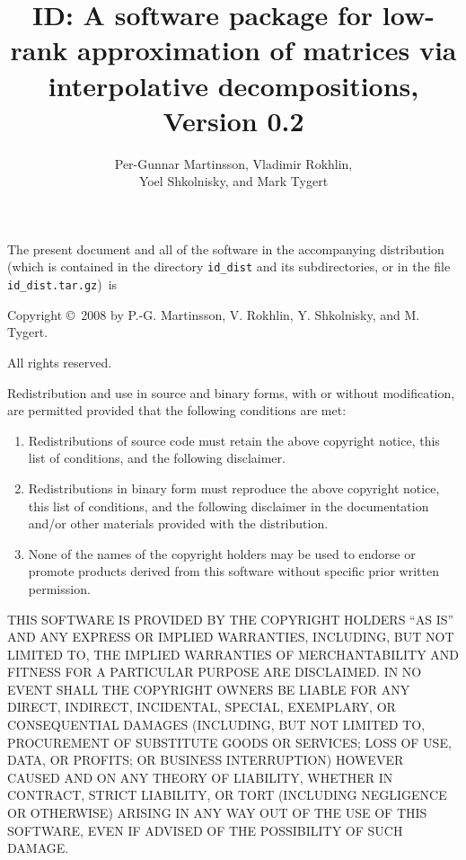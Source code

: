 \documentclass[letterpaper,12pt]{article}
\title{ID: A software package for low-rank approximation
       of matrices via interpolative decompositions, Version 0.2}
\author{Per-Gunnar Martinsson, Vladimir Rokhlin,\\
        Yoel Shkolnisky, and Mark Tygert}
\begin{document}
\maketitle

\newpage

{\parindent=0pt

The present document and all of the software
in the accompanying distribution (which is contained in the directory
{\tt id\_dist} and its subdirectories, or in the file
{\tt id\_dist.tar.gz})\, is

\bigskip

Copyright \copyright\ 2008 by P.-G. Martinsson, V. Rokhlin,
Y. Shkolnisky, and M. Tygert.

\bigskip

All rights reserved.

\bigskip

Redistribution and use in source and binary forms, with or without
modification, are permitted provided that the following conditions are
met:

\begin{enumerate}
\item Redistributions of source code must retain the above copyright
notice, this list of conditions, and the following disclaimer.
\item Redistributions in binary form must reproduce the above copyright
notice, this list of conditions, and the following disclaimer in the
documentation and/or other materials provided with the distribution.
\item None of the names of the copyright holders may be used to endorse
or promote products derived from this software without specific prior
written permission.
\end{enumerate}

\bigskip

THIS SOFTWARE IS PROVIDED BY THE COPYRIGHT HOLDERS ``AS IS'' AND ANY
EXPRESS OR IMPLIED WARRANTIES, INCLUDING, BUT NOT LIMITED TO, THE
IMPLIED WARRANTIES OF MERCHANTABILITY AND FITNESS FOR A PARTICULAR
PURPOSE ARE DISCLAIMED. IN NO EVENT SHALL THE COPYRIGHT OWNERS BE
LIABLE FOR ANY DIRECT, INDIRECT, INCIDENTAL, SPECIAL, EXEMPLARY, OR
CONSEQUENTIAL DAMAGES (INCLUDING, BUT NOT LIMITED TO, PROCUREMENT OF
SUBSTITUTE GOODS OR SERVICES; LOSS OF USE, DATA, OR PROFITS; OR
BUSINESS INTERRUPTION) HOWEVER CAUSED AND ON ANY THEORY OF LIABILITY,
WHETHER IN CONTRACT, STRICT LIABILITY, OR TORT (INCLUDING NEGLIGENCE OR
OTHERWISE) ARISING IN ANY WAY OUT OF THE USE OF THIS SOFTWARE, EVEN IF
ADVISED OF THE POSSIBILITY OF SUCH DAMAGE.

}
\end{document}

